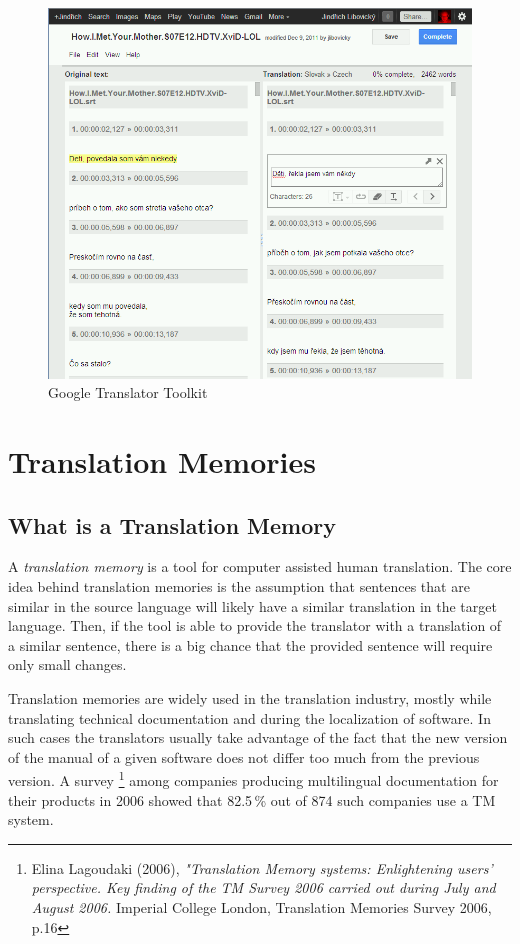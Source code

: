 \begin{figure}

\begin{center}
\includegraphics[scale=0.4]{./figures/google_translator_toolkit.png}
\end{center}

\caption{Google Translator Toolkit} \label{google_translator_toolkit}
\end{figure}

\section{Translation Memories}
\label{sec:translation_memories}
\subsection{What is a Translation Memory}

A \emph{translation memory} is a tool for computer assisted human translation. The core idea behind translation memories is the assumption that sentences that are similar in the source language will likely have a similar translation in the target language. Then, if the tool is able to provide the translator with a translation of a similar sentence, there is a big chance that the provided sentence will require only small changes.

Translation memories are widely used in the translation industry, mostly while translating technical documentation and during the localization of software. In such cases the translators usually take advantage of the fact that the new version of the manual of a given software does not differ too much from the previous version. A survey \footnote{Elina Lagoudaki (2006), \emph{"Translation Memory systems: Enlightening users' perspective. Key finding of the TM Survey 2006 carried out during July and August 2006.} Imperial College London, Translation Memories Survey 2006, p.16} among companies producing multilingual documentation for their products in 2006 showed that 82.5\,\% out of 874 such companies use a TM system.

